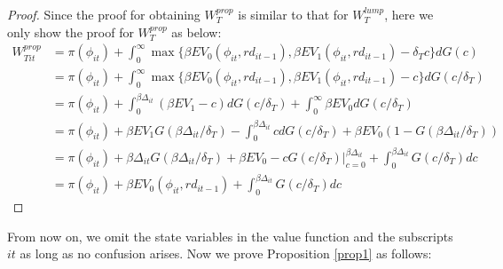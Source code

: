 \documentclass[11pt]{article}
\begin{document}
\begin{proof}
    Since the proof for obtaining $W_T^{prop}$ is similar to that for $W_T^{lump}$, here we only show the proof for $W_T^{prop}$ as below:
\begin{align*}
      W_{Tit}^{prop}
        &=\pi(\phi_{it}) +\int_0^{\infty}\max \{\beta EV_0(\phi_{it}, rd_{it-1}), \beta EV_1(\phi_{it}, rd_{it-1}) - \delta_Tc\}dG(c) \\
        & = \pi(\phi_{it}) + \int_0^{\infty}\max \{\beta EV_0(\phi_{it}, rd_{it-1}), \beta EV_1(\phi_{it}, rd_{it-1}) - c\}dG(c/\delta_T) \\
        & = \pi(\phi_{it}) + \int_{0}^{\beta \Delta_{it}}(\beta EV_1-c)dG(c/\delta_T) +\int_{0}^{\infty}\beta EV_0dG(c/\delta_T) \\
        & = \pi(\phi_{it}) +\beta EV_1G(\beta \Delta_{it}/\delta_T) - \int_0^{\beta \Delta_{it}}cdG(c/\delta_T) + \beta EV_0(1-G(\beta\Delta_{it}/\delta_T)) \\
        & =  \pi(\phi_{it}) +\beta \Delta_{it}G(\beta \Delta_{it}/\delta_T) +\beta EV_0 -cG(c/\delta_T)\bigg|_{c=0}^{\beta\Delta_{it}}+\int_{0}^{\beta \Delta_{it}}G(c/\delta_T)dc \\
        & = \pi(\phi_{it}) + \beta EV_0(\phi_{it}, rd_{it-1}) + \int_{0}^{\beta \Delta_{it}}G(c/\delta_T)dc 
\end{align*}
\end{proof}

From now on, we omit the state variables in the value function and the subscripts $it$ as long as no confusion arises. Now we prove Proposition \ref{prop1} as follows: 
\end{document}
